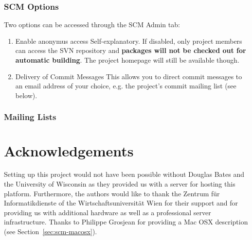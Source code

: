 \documentclass[a4paper]{article}
\begin{document}
\subsubsection{SCM Options}
Two options can be accessed through the SCM Admin tab:
\begin{enumerate}
\item{Enable anonymus access} Self-explanatory. If disabled, only project members can access the SVN repository and  \textbf{packages will not be checked out for automatic building}. The project homepage will still be available though.

\item{Delivery of Commit Messages} This allows you to direct commit messages to an email address of your choice, e.g. the project's commit mailing list (see below). 
\end{enumerate}


\subsubsection{Mailing Lists}



\section{Acknowledgements}

Setting up this project would not have been possible without Douglas
Bates and the University of Wisconsin as they provided us with a
server for hosting this platform. Furthermore, 
the authors would like to thank the Zentrum f\"ur Informatikdienste  
of the Wirtschaftsuniversit\"at Wien for
their support and for providing us with additional hardware as well as a
professional server infrastructure. 
Thanks to Philippe Grosjean for
providing a Mac OSX description (see Section~\ref{sec:scm-macosx}).




\end{document}
